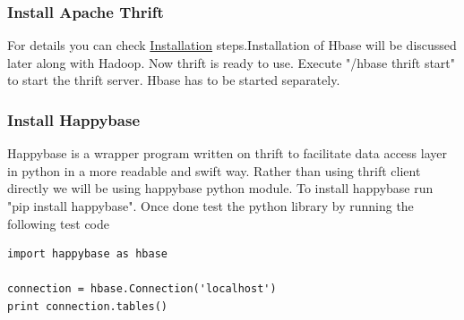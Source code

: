 \documentclass[9pt,twocolumn,twoside]{../../styles/osajnl}
\begin{document}
\subsubsection{Install Apache Thrift \cite{thrift-python-install}}
For details you can check \href{https://acadgild.com/blog/connecting-hbase-with-python-application-using-thrift-server/}{Installation} steps.Installation of Hbase will be discussed later along with Hadoop.
Now thrift is ready to use. Execute "/hbase thrift start" to start the thrift server. Hbase has to be started separately.
\subsubsection{Install Happybase \cite{happybase-install}}
Happybase is a wrapper program written on thrift to facilitate data access layer in python in a more readable and swift way. Rather than using thrift client directly we will be using happybase python module. To install happybase run "pip install happybase". 
Once done test the python library by running the following test code 
\begin{lstlisting}[label=python,caption=Connect-Hbase]
import happybase as hbase				

connection = hbase.Connection('localhost')
print connection.tables()
\end{lstlisting}
\end{document}
